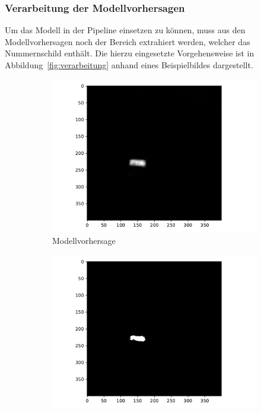 \subsubsection{Verarbeitung der Modellvorhersagen}

Um das Modell in der Pipeline einsetzen zu k\"onnen, muss aus den
Modellvorhersagen noch der Bereich extrahiert werden, welcher das
Nummernschild enth\"alt. Die hierzu eingesetzte Vorgehensweise
ist in Abbildung~\ref{fig:verarbeitung} anhand eines Beispielbildes
dargestellt.

\begin{figure}
    \begin{subfigure}{0.495\textwidth}
        \centering
        \includegraphics[width=\textwidth]{abbildungen/verarbeitung_1}
        \caption{Modellvorhersage}
    \end{subfigure}
    \begin{subfigure}{0.495\textwidth}
        \centering
        \includegraphics[width=\textwidth]{abbildungen/verarbeitung_2}

\end{subfigure}
\end{figure}
